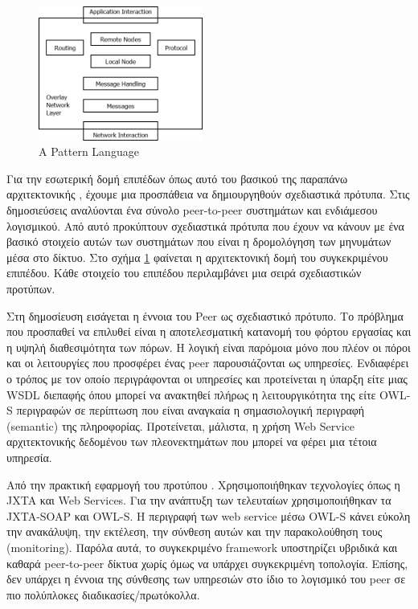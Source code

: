 \begin{figure}
  \begin{center}
    \includegraphics[width=0.48\textwidth]{Figures/Related_work/A_pattern_language.png}
  \end{center}
  \caption{A Pattern Language}
  \label{fig:Patterns}
\end{figure}

Για την εσωτερική δομή επιπέδων όπως αυτό του βασικού της παραπάνω 
αρχιτεκτονικής , έχουμε μια προσπάθεια να δημιουργηθούν σχεδιαστικά 
πρότυπα. Στις δημοσιεύσεις \citep{Grolimund2005, Grolimund2006} αναλύονται 
ένα σύνολο peer-to-peer συστημάτων και ενδιάμεσου λογισμικού. Από αυτό 
προκύπτουν σχεδιαστικά πρότυπα που έχουν να κάνουν με ένα βασικό στοιχείο 
αυτών των συστημάτων που είναι η δρομολόγηση των μηνυμάτων μέσα στο δίκτυο. 
Στο σχήμα \ref{fig:Patterns} φαίνεται η αρχιτεκτονική δομή του συγκεκριμένου επιπέδου. 
Κάθε στοιχείο του επιπέδου περιλαμβάνει μια σειρά σχεδιαστικών προτύπων. 

Στη δημοσίευση \citep{Amoretti2005} εισάγεται η έννοια 
του Peer ως σχεδιαστικό πρότυπο. Το πρόβλημα που προσπαθεί να επιλυθεί 
είναι η αποτελεσματική κατανομή του φόρτου εργασίας και η υψηλή 
διαθεσιμότητα των πόρων. Η λογική είναι παρόμοια μόνο που πλέον οι πόροι 
και οι λειτουργίες που προσφέρει ένας peer παρουσιάζονται ως υπηρεσίες. 
Ενδιαφέρει ο τρόπος με τον οποίο περιγράφονται οι υπηρεσίες και 
προτείνεται η ύπαρξη είτε μιας WSDL διεπαφής όπου μπορεί να ανακτηθεί 
πλήρως η λειτουργικότητα της είτε OWL-S περιγραφών σε περίπτωση που 
είναι αναγκαία η σημασιολογική περιγραφή (semantic) της πληροφορίας. 
Προτείνεται, μάλιστα, η χρήση Web Service αρχιτεκτονικής δεδομένου των 
πλεονεκτημάτων που μπορεί να φέρει μια τέτοια υπηρεσία. 

Από την πρακτική εφαρμογή του προτύπου \citep{Amoretti2005SP2A}. 
Χρησιμοποιήθηκαν τεχνολογίες όπως η JXTA και Web Services. Για την ανάπτυξη 
των τελευταίων χρησιμοποιήθηκαν τα JXTA-SOAP και OWL-S. Η περιγραφή των web 
service μέσω OWL-S κάνει εύκολη την ανακάλυψη, την εκτέλεση, την σύνθεση 
αυτών και την παρακολούθηση τους (monitoring). Παρόλα αυτά, το συγκεκριμένο 
framework υποστηρίζει υβριδικά και καθαρά peer-to-peer δίκτυα χωρίς όμως να 
υπάρχει συγκεκριμένη τοπολογία. Επίσης, δεν υπάρχει η έννοια της 
σύνθεσης των υπηρεσιών στο ίδιο το λογισμικό του peer σε πιο πολύπλοκες 
διαδικασίες/πρωτόκολλα.

